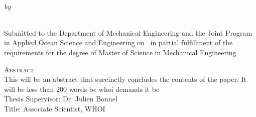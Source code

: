 \begin{center}
{\large \@title} \\
\emph{\footnotesize by} \\
\@author \\
\end{center}

\vspace{-1em}

\begin{center}
\begin{singlespace}
{\parindent0pt
\small
Submitted to the Department of Mechanical Engineering and the Joint Program in Applied Ocean Science and Engineering on \@date ~in partial fulfillment of the requirements for the degree of Master of Science in Mechanical Engineering}
\end{singlespace}
\end{center}

\begin{singlespace}
{\parindent0pt 
	{\large \textsc{Abstract}} \\ %
    This will be an abstract that succinctly concludes the contents of the paper. It will be less than 200 words bc whoi demands it be \\
    
	\noindent Thesis Supervisor: Dr. Julien Bonnel \\
	\noindent Title: Associate Scientist, WHOI \\
}
\end{singlespace}

\newpage
\null
\thispagestyle{empty}
\newpage